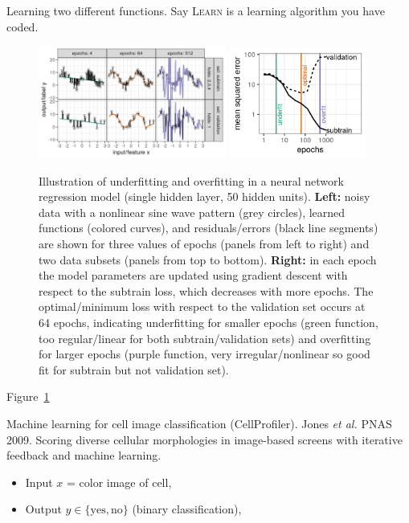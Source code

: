 \documentclass[12pt]{article}
\begin{document}
Learning two different functions.
Say \textsc{Learn} is a learning algorithm you have coded.
\begin{figure}
  \centering
  \includegraphics[width=0.55\textwidth]{figure-overfitting-paper}
  \includegraphics[width=0.4\textwidth]{figure-overfitting-paper-loss}   
  \caption{Illustration of underfitting and overfitting in a neural
    network regression model (single hidden layer, 50 hidden
    units). \textbf{Left:} noisy data with a nonlinear sine wave
    pattern (grey circles), learned functions (colored curves), and
    residuals/errors (black line segments) are shown for three values
    of epochs (panels from left to right) and two data subsets (panels
    from top to bottom). \textbf{Right:} in each epoch the model
    parameters are updated using gradient descent with respect to the
    subtrain loss, which decreases with more epochs. The
    optimal/minimum loss with respect to the validation set occurs at
    64 epochs, indicating underfitting for smaller epochs (green
    function, too regular/linear for both subtrain/validation sets)
    and overfitting for larger epochs (purple function, very
    irregular/nonlinear so good fit for subtrain but not validation
    set).}
  \label{fig:overfitting-paper}
\end{figure}

Figure~\ref{fig:overfitting-paper}

Machine learning for cell image classification (CellProfiler).
Jones {\it et al.} PNAS 2009. Scoring diverse cellular morphologies in
image-based screens with iterative feedback and machine learning.
\begin{itemize}
  \item Input $x$ = color image of cell, 
  \item Output $y\in\{\text{yes}, \text{no}\}$ (binary classification),
\end{itemize}
\end{document}
